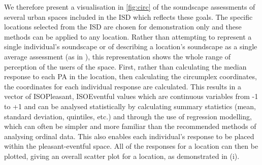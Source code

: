 We therefore present a visualisation in \cref{fig:circ} of the soundscape assessments of several urban spaces included in the ISD \citep{Mitchell2021International} which reflects these goals. The specific locations selected from the ISD are chosen for demonstration only and these methods can be applied to any location. Rather than attempting to represent a single individual's soundscape or of describing a location's soundscape as a single average assessment (as in \citep{Mitchell2021Investigating}), this representation shows the whole range of perception of the users of the space. First, rather than calculating the median response to each PA in the location, then calculating the circumplex coordinates, the coordinates for each individual response are calculated. This results in a vector of ISOPleasant, ISOEventful values which are continuous variables from -1 to +1 and can be analysed statistically by calculating summary statistics (mean, standard deviation, quintiles, etc.) and through the use of regression modelling, which can often be simpler and more familiar than the recommended methods of analysing ordinal data. This also enables each individual's response to be placed within the pleasant-eventful space. All of the responses for a location can then be plotted, giving an overall scatter plot for a location, as demonstrated in (i).


